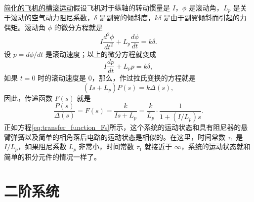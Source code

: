 \underline{简化的飞机的横滚运动}\quad 假设飞机对于纵轴的转动惯量是 $I$，$\phi$ 是滚动角，$L_p$ 是关于滚动的空气动力阻尼系数，$\delta$ 是副翼的倾斜度，$k\delta$ 是由于副翼倾斜而引起的力偶矩。滚动角 $\phi$ 的微分方程就是
\begin{equation*}
I \frac{d^2 \phi}{dt^2} + L_p \frac{d \phi}{dt} = k \delta.
\end{equation*}
设 $p = d \phi / dt$ 是滚动速度；以上的微分方程就变成
\begin{equation*}
I \frac{dp}{dt} + L_p p = k \delta,
\end{equation*}
如果 $t = 0$ 时的滚动速度是 0，那么，作过拉氏变换的方程就是
\begin{equation*}
(Is + L_p) P(s) = k \Delta (s),
\end{equation*}
因此，传递函数 $F(s)$ 就是
\begin{equation}\label{eq:transfer_function_Fs}
\frac{P(s)}{\Delta (s)} = F(s) = \frac{k}{Is + L_p} = \frac{k}{L_p} \cdot \frac{1}{1 + (I/L_p)s}.
\end{equation}
正如方程\eqref{eq:transfer_function_Fs}所示，这个系统的运动状态和具有阻尼器的悬臂弹簧以及简单的相角落后电路的运动状态是相似的。在这里，时间常数 $\tau_1$ 是 $I/L_p$，如果阻尼系数 $L_p$ 非常小，时间常数 $\tau_1$ 就接近于 $\infty$，系统的运动状态就和简单的积分元件的情况一样了。


\section{二阶系统}\label{second_order_system}

